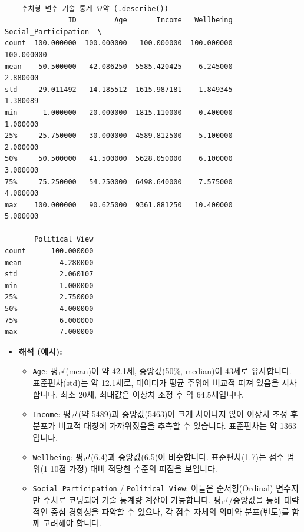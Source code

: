 \documentclass[
  letterpaper,
]{book}
\providecommand{\tightlist}{%
  \setlength{\itemsep}{0pt}\setlength{\parskip}{0pt}}
\begin{document}
\begin{verbatim}

--- 수치형 변수 기술 통계 요약 (.describe()) ---
               ID         Age       Income   Wellbeing  Social_Participation  \
count  100.000000  100.000000   100.000000  100.000000            100.000000   
mean    50.500000   42.086250  5585.420425    6.245000              2.880000   
std     29.011492   14.185512  1615.987181    1.849345              1.380089   
min      1.000000   20.000000  1815.110000    0.400000              1.000000   
25%     25.750000   30.000000  4589.812500    5.100000              2.000000   
50%     50.500000   41.500000  5628.050000    6.100000              3.000000   
75%     75.250000   54.250000  6498.640000    7.575000              4.000000   
max    100.000000   90.625000  9361.881250   10.400000              5.000000   

       Political_View  
count      100.000000  
mean         4.280000  
std          2.060107  
min          1.000000  
25%          2.750000  
50%          4.000000  
75%          6.000000  
max          7.000000  
\end{verbatim}

\begin{itemize}
\tightlist
\item
  \textbf{해석 (예시):}

  \begin{itemize}
  \tightlist
  \item
    \texttt{Age}: 평균(mean)이 약 42.1세, 중앙값(50\%, median)이 43세로
    유사합니다. 표준편차(std)는 약 12.1세로, 데이터가 평균 주위에 비교적
    퍼져 있음을 시사합니다. 최소 20세, 최대값은 이상치 조정 후 약
    64.5세입니다.
  \item
    \texttt{Income}: 평균(약 5489)과 중앙값(5463)이 크게 차이나지 않아
    이상치 조정 후 분포가 비교적 대칭에 가까워졌음을 추측할 수 있습니다.
    표준편차는 약 1363입니다.
  \item
    \texttt{Wellbeing}: 평균(6.4)과 중앙값(6.5)이 비슷합니다.
    표준편차(1.7)는 점수 범위(1-10점 가정) 대비 적당한 수준의 퍼짐을
    보입니다.
  \item
    \texttt{Social\_Participation} / \texttt{Political\_View}: 이들은
    순서형(Ordinal) 변수지만 수치로 코딩되어 기술 통계량 계산이
    가능합니다. 평균/중앙값을 통해 대략적인 중심 경향성을 파악할 수
    있으나, 각 점수 자체의 의미와 분포(빈도)를 함께 고려해야 합니다.
  \end{itemize}
\end{itemize}
\end{document}
